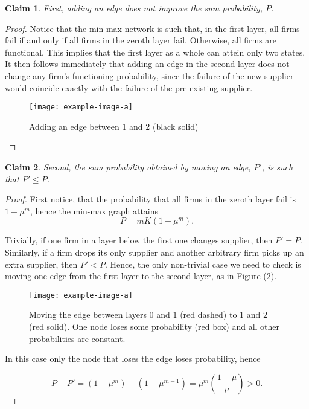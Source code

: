 \documentclass[american, abstract=on]{scrartcl}
\newcommand{\inputTikZ}[2]{%
    \scalebox{#1}{}  
    }
\theoremstyle{plain}
\newtheorem{claim}{Claim}
\begin{document}
\begin{claim} \label{claim:min-max:first}
    First, adding an edge does not improve the sum probability, $P$. \end{claim} \begin{proof}
    Notice that the min-max network is such that, in the first layer, all firms fail if and only if all firms in the zeroth layer fail. Otherwise, all firms are functional. This implies that the first layer as a whole can attein only two states. It then follows immediately that adding an edge in the second layer does not change any firm's functioning probability, since the failure of the new supplier would coincide exactly with the failure of the pre-existing supplier.

    \begin{figure}[H]
        \centering
        \texttt{[image: example-image-a]}
        \caption{Adding an edge between $1$ and $2$ (black solid)} \label{fig:adding-an-edge}
    \end{figure}


\end{proof}

\begin{claim} \label{claim:min-max:second}
    Second, the sum probability obtained by moving an edge, $P'$, is such that $P' \leq P$.
\end{claim}
\begin{proof}
    First notice, that the probability that all firms in the zeroth layer fail is $1 - \mu^m$, hence the min-max graph attains
    \begin{equation}
        P = m K (1 - \mu^{m}).
    \end{equation}

    Trivially, if one firm in a layer below the first one changes supplier, then $P' = P$. Similarly, if a firm drops its only supplier and another arbitrary firm picks up an extra supplier, then $P' < P$. Hence, the only non-trivial case we need to check is moving one edge from the first layer to the second layer, as in Figure (\ref{fig:min-max-moving-edge}).

    \begin{figure}[H]
        \centering
        \texttt{[image: example-image-a]}
        \caption{Moving the edge between layers $0$ and $1$ (red dashed) to $1$ and $2$ (red solid). One node loses some probability (red box) and all other probabilities are constant.} \label{fig:min-max-moving-edge}
    \end{figure}

    In this case only the node that loses the edge loses probability, hence

    \begin{equation}
        P - P' = (1 - \mu^m) - (1 - \mu^{m-1}) = \mu^m \left(\frac{1 - \mu}{\mu}\right) > 0.
    \end{equation}
\end{proof}
\end{document}
